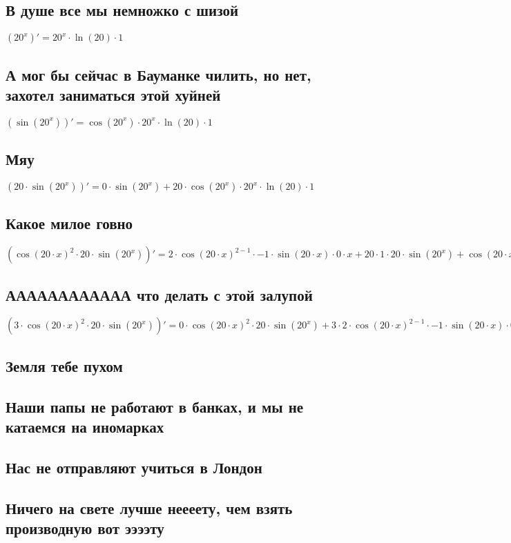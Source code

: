 \documentclass[12pt]{article}
\begin{document}
\subsection{В душе все мы немножко с шизой}
$(20^{x})' = 20^{x} \cdot \ln(20) \cdot 1$
\subsection{А мог бы сейчас в Бауманке чилить, но нет, захотел заниматься этой хуйней}
$(\sin(20^{x}))' = \cos(20^{x}) \cdot 20^{x} \cdot \ln(20) \cdot 1$
\subsection{Мяу}
$(20 \cdot \sin(20^{x}))' = 0 \cdot \sin(20^{x}) + 20 \cdot \cos(20^{x}) \cdot 20^{x} \cdot \ln(20) \cdot 1$
\subsection{Какое милое говно}
$(\cos(20 \cdot x)^{2} \cdot 20 \cdot \sin(20^{x}))' = 2 \cdot \cos(20 \cdot x)^{2 - 1} \cdot -1 \cdot \sin(20 \cdot x) \cdot 0 \cdot x + 20 \cdot 1 \cdot 20 \cdot \sin(20^{x}) + \cos(20 \cdot x)^{2} \cdot 0 \cdot \sin(20^{x}) + 20 \cdot \cos(20^{x}) \cdot 20^{x} \cdot \ln(20) \cdot 1$
\subsection{АААААААААААА что делать с этой залупой}
$(3 \cdot \cos(20 \cdot x)^{2} \cdot 20 \cdot \sin(20^{x}))' = 0 \cdot \cos(20 \cdot x)^{2} \cdot 20 \cdot \sin(20^{x}) + 3 \cdot 2 \cdot \cos(20 \cdot x)^{2 - 1} \cdot -1 \cdot \sin(20 \cdot x) \cdot 0 \cdot x + 20 \cdot 1 \cdot 20 \cdot \sin(20^{x}) + \cos(20 \cdot x)^{2} \cdot 0 \cdot \sin(20^{x}) + 20 \cdot \cos(20^{x}) \cdot 20^{x} \cdot \ln(20) \cdot 1$
\subsection{Земля тебе пухом}
\subsection{Наши папы не работают в банках, и мы не катаемся на иномарках}
\subsection{Нас не отправляют учиться в Лондон}
\subsection{Ничего на свете лучше неееету, чем взять производную вот ээээту}
\end{document}
